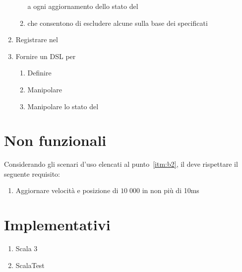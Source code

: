 \begin{enumerate}[label=\textbf{\ref{sec:funzionali}.\arabic*}]
\begin{enumerate}[label=\textbf{\ref{itm:f7}.\arabic*}]
        a ogni aggiornamento dello stato del \World
        \item \label{itm:ff11} \System che consentono di escludere alcune \Entity sulla base dei \Component specificati
    \end{enumerate}
    \item \label{itm:f8} Registrare \System nel \World
    \item \label{itm:f9} Fornire un DSL per
    \begin{enumerate}[label=\textbf{\ref{itm:f9}.\arabic*}]
        \item \label{itm:ff12} Definire \System
        \item \label{itm:ff13} Manipolare \Entity
        \item \label{itm:ff14} Manipolare lo stato del \World
    \end{enumerate}
\end{enumerate}


\section{Non funzionali}\label{sec:non-funzionali}
Considerando gli scenari d'uso elencati al punto~\ref{itm:b2}, il \System deve rispettare il seguente requisito:
\begin{enumerate}[label=\textbf{\ref{sec:non-funzionali}.\arabic*}]
    \item \label{itm:nf1} Aggiornare velocità e posizione di $10\;000$ \Entity in non più di 10ms
\end{enumerate}


\section{Implementativi}\label{sec:implementativi}
\begin{enumerate}[label=\textbf{\ref{sec:implementativi}.\arabic*}]
    \item \label{itm:i1} Scala 3
    \item \label{itm:i2} ScalaTest~\cite{scalatest}
\end{enumerate}
